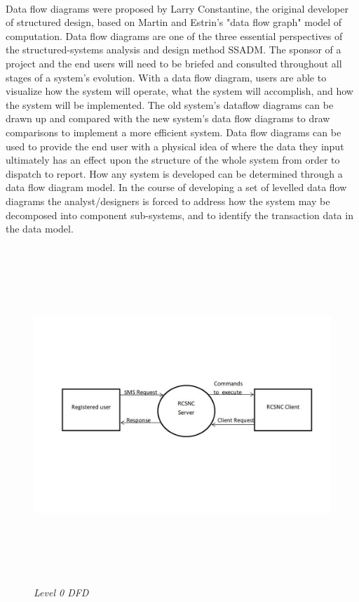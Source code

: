 \paragraph{}
Data flow diagrams were proposed by Larry Constantine, the original developer of structured design, based on Martin and Estrin's "data flow graph" model of computation.
Data flow diagrams are one of the three essential perspectives of the structured-systems analysis and design method SSADM. The sponsor of a project and the end users will need to be briefed and consulted throughout all stages of a system's evolution. With a data flow diagram, users are able to visualize how the system will operate, what the system will accomplish, and how the system will be implemented. The old system's dataflow diagrams can be drawn up and compared with the new system's data flow diagrams to draw comparisons to implement a more efficient system. Data flow diagrams can be used to provide the end user with a physical idea of where the data they input ultimately has an effect upon the structure of the whole system from order to dispatch to report. How any system is developed can be determined through a data flow diagram model.
In the course of developing a set of levelled data flow diagrams the analyst/designers is forced to address how the system may be decomposed into component sub-systems, and to identify the transaction data in the data model.
\newpage
\begin{figure}[h!]
\centering
\includegraphics[height=5in, width = 5in]{DFD0.jpg}
\caption{\emph{Level 0 DFD}}
\label{fig:1}
\end{figure}
